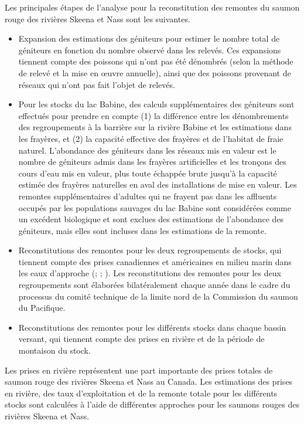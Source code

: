 \documentclass[french,11pt]{book}
\begin{document}
Les principales étapes de l'analyse pour la reconstitution des remontes du saumon rouge des rivières Skeena et Nass sont les suivantes.
\begin{itemize}

\item
  Expansion des estimations des géniteurs pour estimer le nombre total de géniteurs en fonction du nombre observé dans les relevés. Ces expansions tiennent compte des poissons qui n'ont pas été dénombrés (selon la méthode de relevé et la mise en œuvre annuelle), ainsi que des poissons provenant de réseaux qui n'ont pas fait l'objet de relevés.
\item
  Pour les stocks du lac Babine, des calculs supplémentaires des géniteurs sont effectués pour prendre en compte (1) la différence entre les dénombrements des regroupements à la barrière sur la rivière Babine et les estimations dans les frayères, et (2) la capacité effective des frayères et de l'habitat de fraie naturel. L'abondance des géniteurs dans les réseaux mis en valeur est le nombre de géniteurs admis dans les frayères artificielles et les tronçons des cours d'eau mis en valeur, plus toute échappée brute jusqu'à la capacité estimée des frayères naturelles en aval des installations de mise en valeur. Les remontes supplémentaires d'adultes qui ne frayent pas dans les affluents occupés par les populations sauvages du lac Babine sont considérées comme un excédent biologique et sont exclues des estimations de l'abondance des géniteurs, mais elles sont incluses dans les estimations de la remonte.
\item
  Reconstitutions des remontes pour les deux regroupements de stocks, qui tiennent compte des prises canadiennes et américaines en milieu marin dans les eaux d'approche (; ; ). Les reconstitutions des remontes pour les deux regroupements sont élaborées bilatéralement chaque année dans le cadre du processus du comité technique de la limite nord de la Commission du saumon du Pacifique.
\item
  Reconstitutions des remontes pour les différents stocks dans chaque bassin versant, qui tiennent compte des prises en rivière et de la période de montaison du stock.
\end{itemize}
Les prises en rivière représentent une part importante des prises totales de saumon rouge des rivières Skeena et Nass au Canada. Les estimations des prises en rivière, des taux d'exploitation et de la remonte totale pour les différents stocks sont calculées à l'aide de différentes approches pour les saumons rouges des rivières Skeena et Nass.
\end{document}
